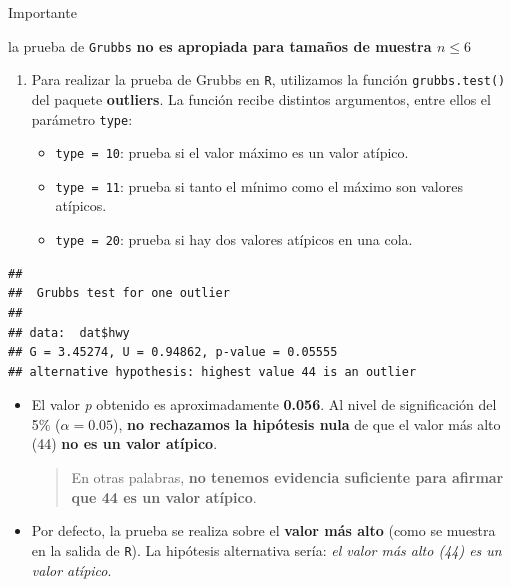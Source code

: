 \documentclass[
]{book}
\newenvironment{Shaded}{\begin{snugshade}}{\end{snugshade}}
\newcommand{\FunctionTok}[1]{\textcolor[rgb]{0.13,0.29,0.53}{\textbf{#1}}}
\newcommand{\NormalTok}[1]{#1}
\newcommand{\OtherTok}[1]{\textcolor[rgb]{0.56,0.35,0.01}{#1}}
\newcommand{\SpecialCharTok}[1]{\textcolor[rgb]{0.81,0.36,0.00}{\textbf{#1}}}
\providecommand{\tightlist}{%
  \setlength{\itemsep}{0pt}\setlength{\parskip}{0pt}}
\begin{document}
{} Importante

la prueba de \texttt{Grubbs} \textbf{no es apropiada para tamaños de muestra \(n \leq 6\)}

\begin{enumerate}
\def\labelenumi{\arabic{enumi}.}
\item
  Para realizar la prueba de Grubbs en \texttt{R}, utilizamos la función \texttt{grubbs.test()} del paquete \textbf{outliers}. La función recibe distintos argumentos, entre ellos el parámetro \texttt{type}:

  \begin{itemize}
  \tightlist
  \item
    \texttt{type\ =\ 10}: prueba si el valor máximo es un valor atípico.
  \item
    \texttt{type\ =\ 11}: prueba si tanto el mínimo como el máximo son valores atípicos.
  \item
    \texttt{type\ =\ 20}: prueba si hay dos valores atípicos en una cola.
  \end{itemize}
\end{enumerate}

\begin{Shaded}
\end{Shaded}

\begin{verbatim}
## 
##  Grubbs test for one outlier
## 
## data:  dat$hwy
## G = 3.45274, U = 0.94862, p-value = 0.05555
## alternative hypothesis: highest value 44 is an outlier
\end{verbatim}

\begin{itemize}
\item
  El valor \emph{p} obtenido es aproximadamente \textbf{0.056}. Al nivel de significación del 5\% (\(\alpha = 0.05\)), \textbf{no rechazamos la hipótesis nula} de que el valor más alto (44) \textbf{no es un valor atípico}.

  \begin{quote}
  En otras palabras, \textbf{no tenemos evidencia suficiente para afirmar que 44 es un valor atípico}.
  \end{quote}
\item
  Por defecto, la prueba se realiza sobre el \textbf{valor más alto} (como se muestra en la salida de \texttt{R}). La hipótesis alternativa sería: \emph{el valor más alto (44) es un valor atípico}.
\end{itemize}
\end{document}
